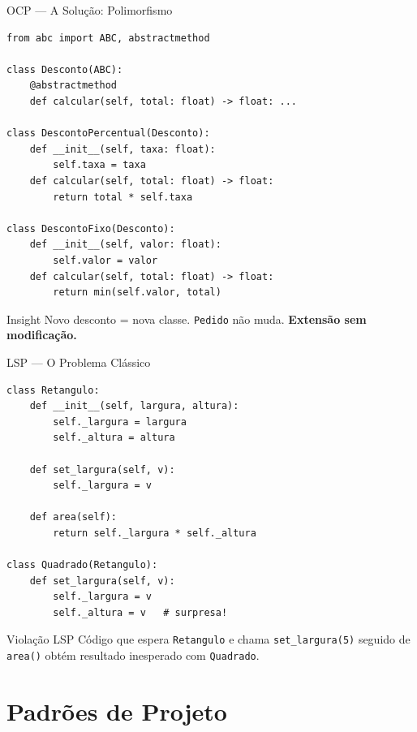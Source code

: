 \documentclass[aspectratio=169]{beamer}
\begin{document}
\begin{frame}[fragile,shrink=20]{OCP --- A Solução: Polimorfismo}
\begin{lstlisting}
from abc import ABC, abstractmethod

class Desconto(ABC):
    @abstractmethod
    def calcular(self, total: float) -> float: ...

class DescontoPercentual(Desconto):
    def __init__(self, taxa: float):
        self.taxa = taxa
    def calcular(self, total: float) -> float:
        return total * self.taxa

class DescontoFixo(Desconto):
    def __init__(self, valor: float):
        self.valor = valor
    def calcular(self, total: float) -> float:
        return min(self.valor, total)
\end{lstlisting}

\begin{exampleblock}{Insight}
Novo desconto = nova classe. \texttt{Pedido} não muda. \textbf{Extensão sem modificação.}
\end{exampleblock}
\end{frame}

\begin{frame}[fragile,shrink=15]{LSP --- O Problema Clássico}
\begin{lstlisting}
class Retangulo:
    def __init__(self, largura, altura):
        self._largura = largura
        self._altura = altura

    def set_largura(self, v):
        self._largura = v

    def area(self):
        return self._largura * self._altura

class Quadrado(Retangulo):
    def set_largura(self, v):
        self._largura = v
        self._altura = v   # surpresa!
\end{lstlisting}

\begin{alertblock}{Violação LSP}
Código que espera \texttt{Retangulo} e chama \texttt{set\_largura(5)} seguido de \texttt{area()} obtém resultado inesperado com \texttt{Quadrado}.
\end{alertblock}
\end{frame}

\section{Padrões de Projeto}
\end{document}
